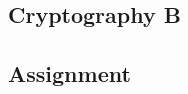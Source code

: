 \documentclass[a4paper,11pt]{article}
\begin{document}
    \begin{center}
        \section*{Cryptography B}
        \subsection*{Assignment}
    \end{center}
\end{document}
